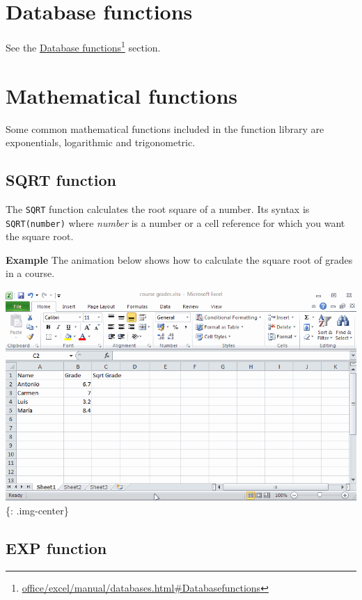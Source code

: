 \chapter{Database functions}
\label{databasefunctions}

See the \href{office/excel/manual/databases.html#Databasefunctions}{Database functions}\footnote{\href{office/excel/manual/databases.html#Databasefunctions}{office\slash excel\slash manual\slash databases.html\#Databasefunctions}} section.

\chapter{Mathematical functions}
\label{mathematicalfunctions}

Some common mathematical functions included in the function library are exponentials, logarithmic and trigonometric. 

\section{SQRT function}
\label{sqrtfunction}

The \texttt{SQRT} function calculates the root square of a number. Its syntax is \texttt{SQRT(number)} where \emph{number} is a number or a cell reference for which you want the square root. 

\textbf{Example} The animation below shows how to calculate the square root of grades in a course.

\includegraphics[keepaspectratio,width=\textwidth,height=0.75\textheight]{img/example_function_sqrt.gif}
\{: .img-center\}

\section{EXP function}
\label{expfunction}

